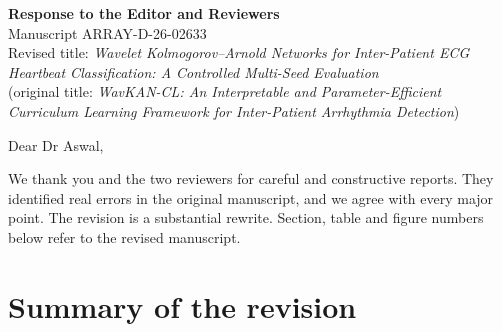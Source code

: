 \documentclass[11pt]{article}
\begin{document}
\begin{center}
{\Large\bfseries Response to the Editor and Reviewers}\\[4pt]
Manuscript ARRAY-D-26-02633\\[2pt]
Revised title: \emph{Wavelet Kolmogorov--Arnold Networks for Inter-Patient ECG Heartbeat Classification: A Controlled Multi-Seed Evaluation}\\[2pt]
(original title: \emph{WavKAN-CL: An Interpretable and Parameter-Efficient Curriculum Learning Framework for Inter-Patient Arrhythmia Detection})
\end{center}

Dear Dr Aswal,

We thank you and the two reviewers for careful and constructive reports. They identified real errors in the original manuscript, and we agree with every major point. The revision is a substantial rewrite. Section, table and figure numbers below refer to the revised manuscript.

\section*{Summary of the revision}
\end{document}
